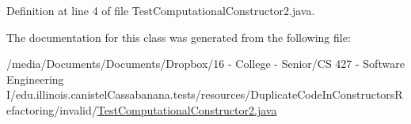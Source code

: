 Definition at line 4 of file TestComputationalConstructor2.java.



The documentation for this class was generated from the following file:\begin{DoxyCompactItemize}
\item 
/media/Documents/Documents/Dropbox/16 -\/ College -\/ Senior/CS 427 -\/ Software Engineering I/edu.illinois.canistelCassabanana.tests/resources/DuplicateCodeInConstructorsRefactoring/invalid/\hyperlink{TestComputationalConstructor2_8java}{TestComputationalConstructor2.java}\end{DoxyCompactItemize}
